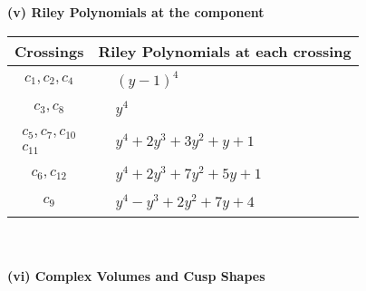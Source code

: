\documentclass[1p]{elsarticle_modified}
\theoremstyle{definition}
\begin{document}
\newpage\renewcommand{\arraystretch}{1}
\flushleft \textbf{(v) Riley Polynomials at the component}\newline \\
\begin{tabular}{m{50pt}|m{274pt}}
Crossings & \hspace{64pt}Riley Polynomials at each crossing \\
\hline $$\begin{aligned}c_{1},c_{2},c_{4}\end{aligned}$$&$\begin{aligned}
&(y-1)^4
\end{aligned}$\\
\hline $$\begin{aligned}c_{3},c_{8}\end{aligned}$$&$\begin{aligned}
&y^4
\end{aligned}$\\
\hline $$\begin{aligned}c_{5},c_{7},c_{10}\\c_{11}\end{aligned}$$&$\begin{aligned}
&y^4+2 y^3+3 y^2+y+1
\end{aligned}$\\
\hline $$\begin{aligned}c_{6},c_{12}\end{aligned}$$&$\begin{aligned}
&y^4+2 y^3+7 y^2+5 y+1
\end{aligned}$\\
\hline $$\begin{aligned}c_{9}\end{aligned}$$&$\begin{aligned}
&y^4- y^3+2 y^2+7 y+4
\end{aligned}$\\
\hline
\end{tabular}\\~\\
\newpage\flushleft \textbf{(vi) Complex Volumes and Cusp Shapes}
\end{document}
